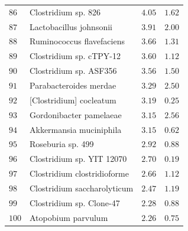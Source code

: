 \begin{center}
\begin{longtable}{|l|l|l|l|}
$86$ & Clostridium sp. 826 & $4.05$ & $1.62$ \\
$87$ & Lactobacillus johnsonii & $3.91$ & $2.00$ \\
$88$ & Ruminococcus flavefaciens & $3.66$ & $1.31$ \\
$89$ & Clostridium sp. cTPY-12 & $3.60$ & $1.12$ \\
$90$ & Clostridium sp. ASF356 & $3.56$ & $1.50$ \\
$91$ & Parabacteroides merdae & $3.29$ & $2.50$ \\
$92$ & [Clostridium] cocleatum & $3.19$ & $0.25$ \\
$93$ & Gordonibacter pamelaeae & $3.15$ & $2.56$ \\
$94$ & Akkermansia muciniphila & $3.15$ & $0.62$ \\
$95$ & Roseburia sp. 499 & $2.92$ & $0.88$ \\
$96$ & Clostridium sp. YIT 12070 & $2.70$ & $0.19$ \\
$97$ & Clostridium clostridioforme & $2.66$ & $1.12$ \\
$98$ & Clostridium saccharolyticum & $2.47$ & $1.19$ \\
$99$ & Clostridium sp. Clone-47 & $2.28$ & $0.88$ \\
$100$ & Atopobium parvulum & $2.26$ & $0.75$ \\

\end{longtable}
\end{center}